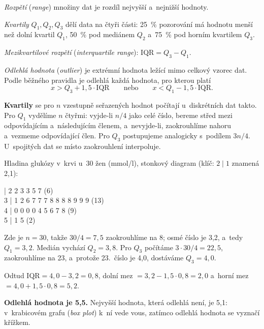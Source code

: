 \documentclass[11pt,a4paper]{article}
\theoremstyle{definition}
\begin{document}
\begin{defbox}
\emph{Rozpětí} (\emph{range}) množiny dat je rozdíl nejvyšší a~nejnižší hodnoty.

\emph{Kvartily} $Q_1,Q_2,Q_3$ dělí data na čtyři části: 25~\% pozorování má hodnotu menší
než dolní kvartil $Q_1$, 50~\% pod mediánem $Q_2$ a~75~\% pod horním kvartilem $Q_3$.

\emph{Mezikvartilové rozpětí} (\emph{interquartile range}): $\mathrm{IQR}=Q_3-Q_1$.

\emph{Odlehlá hodnota} (\emph{outlier}) je extrémní hodnota ležící mimo celkový vzorec dat.
Podle běžného pravidla je odlehlá každá hodnota, pro kterou platí
\[ x > Q_3 + 1{,}5\cdot \mathrm{IQR} \qquad\text{nebo}\qquad x < Q_1 - 1{,}5\cdot \mathrm{IQR}. \]
\end{defbox}

\textbf{Kvartily} se pro $n$ vzestupně seřazených hodnot počítají u~diskrétních dat takto. Pro
$Q_1$ vydělíme $n$ čtyřmi: vyjde-li $n/4$ jako celé číslo, bereme střed mezi odpovídajícím
a~následujícím členem, a~nevyjde-li, zaokrouhlíme nahoru a~vezmeme odpovídající člen. Pro
$Q_3$ postupujeme analogicky s~podílem $3n/4$. U~spojitých dat se místo zaokrouhlení
interpoluje.

\begin{defbox}
Hladina glukózy v~krvi u~30 žen (mmol/l), stonkový diagram (klíč: $2\mid 1$ znamená 2,1):
\begin{center} | 2 2 3 3 5 7 \hfill (6)\\
3 | 1 2 6 7 7 7 8 8 8 8 9 9 9 \hfill (13)\\
4 | 0 0 0 0 4 5 6 7 8 \hfill (9)\\
5 | 1 5 \hfill (2)
\end{center}
Zde je $n=30$, takže $30/4=7{,}5$ zaokrouhlíme na 8; osmé číslo je 3,2, a~tedy $Q_1=3{,}2$.
Medián vychází $Q_2=3{,}8$. Pro $Q_3$ počítáme $3\cdot 30/4=22{,}5$, zaokrouhlíme na 23,
a~protože 23.\ číslo je 4,0, dostáváme $Q_3=4{,}0$.

Odtud $\mathrm{IQR}=4{,}0-3{,}2=0{,}8$, dolní mez $=3{,}2-1{,}5\cdot 0{,}8=2{,}0$ a~horní mez
$=4{,}0+1{,}5\cdot 0{,}8=5{,}2$.

\textbf{Odlehlá hodnota je 5,5.} Nejvyšší hodnota, která odlehlá není, je 5,1: v~krabicovém
grafu (\emph{box plot}) k~ní vede vous, zatímco odlehlá hodnota se vyznačí křížkem.
\end{defbox}
\end{document}
